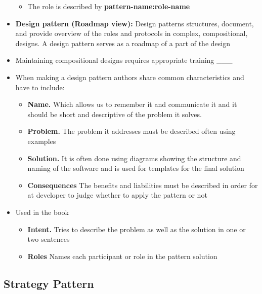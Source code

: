 \documentclass[11pt]{article}
\providecommand{\tightlist}{%
      \setlength{\itemsep}{0pt}\setlength{\parskip}{0pt}}
\begin{document}
\begin{itemize}
  \begin{itemize}
  \tightlist
  \item
    The role is described by \textbf{pattern-name:role-name}
  \end{itemize}
\item
  \textbf{Design pattern (Roadmap view):} Design patterns structures,
  document, and provide overview of the roles and protocols in complex,
  compositional, designs. A design pattern serves as a roadmap of a part
  of the design
\item
  Maintaining compositional designs requires appropriate training \_\_\_
\item
  When making a design pattern authors share common characteristics and
  have to include:

  \begin{itemize}
  \tightlist
  \item
    \textbf{Name.} Which allows us to remember it and communicate it and
    it should be short and descriptive of the problem it solves.
  \item
    \textbf{Problem.} The problem it addresses must be described often
    using examples
  \item
    \textbf{Solution.} It is often done using diagrams showing the
    structure and naming of the software and is used for templates for
    the final solution
  \item
    \textbf{Consequences} The benefits and liabilities must be described
    in order for at developer to judge whether to apply the pattern or
    not
  \end{itemize}
\item
  Used in the book

  \begin{itemize}
  \tightlist
  \item
    \textbf{Intent.} Tries to describe the problem as well as the
    solution in one or two sentences
  \item
    \textbf{Roles} Names each participant or role in the pattern
    solution
  \end{itemize}
\end{itemize}

\hypertarget{strategy-pattern}{%
\subsection{Strategy Pattern}\label{strategy-pattern}}
\end{document}
